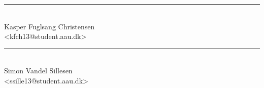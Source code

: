 \noindent
\begin{minipage}[b]{0.45\textwidth}
 \centering
 \rule{\textwidth}{0.5pt}\\
  Kasper Fuglsang Christensen\\
 {\footnotesize <kfch13@student.aau.dk>}
\end{minipage}
\hfill
\begin{minipage}[b]{0.45\textwidth}
 \centering
 \rule{\textwidth}{0.5pt}\\
  Simon Vandel Sillesen\\
 {\footnotesize <ssille13@student.aau.dk>}
\end{minipage}
\vspace{3\baselineskip}